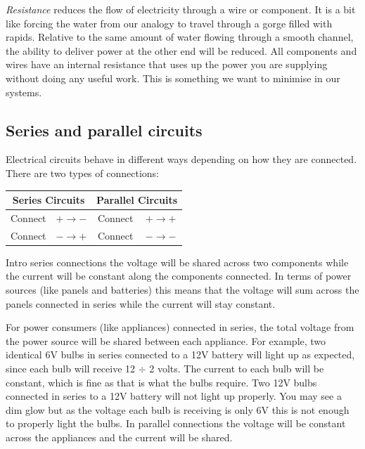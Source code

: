 \documentclass{article}
\theoremstyle{definition}
\theoremstyle{definition}
\theoremstyle{remark}
\begin{document}
    \textit{Resistance} reduces the flow of electricity through a wire or component. It is a bit like forcing the water from our analogy to travel through a gorge filled with rapids. Relative to the same amount of water flowing through a smooth channel, the ability to deliver power at the other end will be reduced. All components and wires have an internal resistance that uses up the power you are supplying without doing any useful work. This is something we want to minimise in our systems. 
  

  \subsection{Series and parallel circuits} %
  \label{sub:series_and_parallel_circuits}

    Electrical circuits behave in different ways depending on how they are connected. There are two types of connections: 

      \begin{table}[!ht]
        \centering
        \begin{tabular}{|| c | c | c | c ||}
          \hline
          \multicolumn{2}{|c|}{Series Circuits}  & \multicolumn{2}{|c|}{Parallel Circuits}  \\
          \hline \hline
          Connect & $+ \rightarrow -$ & Connect & $+ \rightarrow +$ \\
          \hline
          Connect & $- \rightarrow +$ & Connect & $- \rightarrow -$ \\
          \hline
        \end{tabular}
        \label{table:two_types_of_connections}
      \end{table}

    Intro series connections the voltage will be shared across two components while the current will be constant along the components connected. In terms of power sources (like panels and batteries) this means that the voltage will sum across the panels connected in series while the current will stay constant. 

    For power consumers (like appliances) connected in series, the total voltage from the power source will be shared between each appliance. For example, two identical 6V bulbs in series connected to a 12V battery will light up as expected, since each bulb will receive 12 \(\div\) 2 volts. The current to each bulb will be constant, which is fine as that is what the bulbs require. Two 12V bulbs connected in series to a 12V battery will not light up properly. You may see a dim glow but as the voltage each bulb is receiving is only 6V this is not enough to properly light the bulbs. In parallel connections the voltage will be constant across the appliances and the current will be shared.
\end{document}
